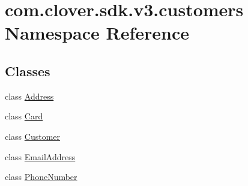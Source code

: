 \hypertarget{namespacecom_1_1clover_1_1sdk_1_1v3_1_1customers}{}\section{com.\+clover.\+sdk.\+v3.\+customers Namespace Reference}
\label{namespacecom_1_1clover_1_1sdk_1_1v3_1_1customers}
\subsection*{Classes}
\begin{DoxyCompactItemize}
\item 
class \hyperlink{classcom_1_1clover_1_1sdk_1_1v3_1_1customers_1_1_address}{Address}
\item 
class \hyperlink{classcom_1_1clover_1_1sdk_1_1v3_1_1customers_1_1_card}{Card}
\item 
class \hyperlink{classcom_1_1clover_1_1sdk_1_1v3_1_1customers_1_1_customer}{Customer}
\item 
class \hyperlink{classcom_1_1clover_1_1sdk_1_1v3_1_1customers_1_1_email_address}{Email\+Address}
\item 
class \hyperlink{classcom_1_1clover_1_1sdk_1_1v3_1_1customers_1_1_phone_number}{Phone\+Number}
\end{DoxyCompactItemize}
